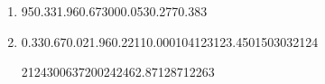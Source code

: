 
\begin{question}
    
    \begin{enumerate}[label={\textbf{\alph*)}}]

        \item 
        
             \begin{formula3}
                {95}{0.33}{1.96}{0.67}{300}{0.053}{0.277}{0.383}
             \end{formula3}

        \item 
            
            \begin{formula4}
                {0.33}{0.67}{0.02}{1.96}{0.2211}{0.000104123}{123.450150303}{2124}
            \end{formula4}

            \begin{formula5}
                {2124}{300}{637200}{2424}{62.87128712}{263}
            \end{formula5}

    \end{enumerate}
\end{question}
